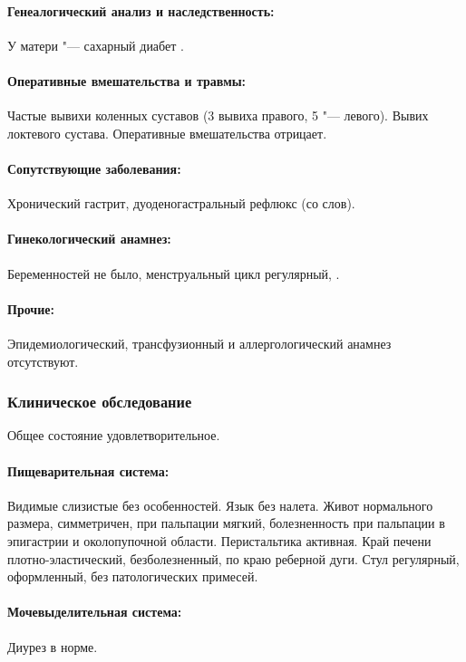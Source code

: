 \documentclass[a4paper,14pt]{extarticle}
\begin{document}
\paragraph{Генеалогический анализ и наследственность:} У матери "--- сахарный диабет .

\paragraph{Оперативные вмешательства и травмы:} Частые вывихи коленных суставов (3 вывиха правого, 5 "--- левого). Вывих локтевого сустава. Оперативные вмешательства отрицает.

\paragraph{Сопутствующие заболевания:} Хронический гастрит, дуоденогастральный рефлюкс (со слов).

\paragraph{Гинекологический анамнез:} Беременностей не было, менструальный цикл регулярный, .

\paragraph{Прочие:} Эпидемиологический, трансфузионный и аллергологический анамнез отсутствуют.

\subsubsection*{Клиническое обследование}

Общее состояние удовлетворительное.

\paragraph{Пищеварительная система:} Видимые слизистые без особенностей. Язык без налета. Живот нормального размера, симметричен, при пальпации мягкий, болезненность при пальпации в эпигастрии и околопупочной области. Перистальтика активная. Край печени плотно-эластический, безболезненный, по краю реберной дуги. Стул регулярный, оформленный, без патологических примесей.

\paragraph{Мочевыделительная система:} Диурез в норме.
\end{document}
